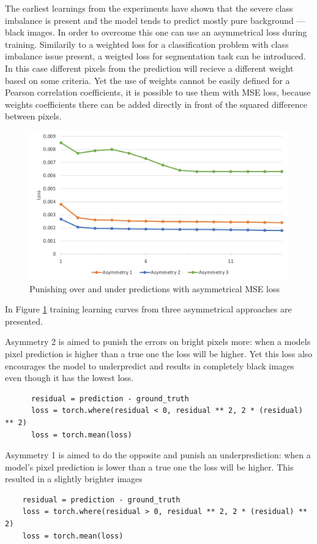 The earliest learnings from the experiments have shown that the severe class imbalance is present and the model tends to predict mostly pure background --- black images. In order to overcome this one can use an asymmetrical loss during training. Similarily to a weighted loss for a classification problem with class imbalance issue present, a weigted loss for segmentation task can be introduced. In this case different pixels from the prediction will recieve a different weight based on some criteria. Yet the use of weights cannot be easily defined for a Pearson correlation coefficients, it is possible to use them with MSE loss, because weights coefficients there can be added directly in front of the squared difference between pixels. 
\begin{figure}[H]
	\begin{center}
		\includegraphics[width=0.5\linewidth]{bilder/golgi/asymmetrical-training.jpg}
		\caption{Punishing over and under predictions with asymmetrical MSE loss}\label{fig:golgi-asymmetrical-training}
	\end{center}
\end{figure}

In Figure \ref{fig:golgi-asymmetrical-training} training learning curves from three asymmetrical approaches are presented.

Asymmetry 2 is aimed to punish the errors on bright pixels more: when a models pixel prediction is higher than a true one the loss will be higher. Yet this loss also encourages the model to underpredict and results in completely black images even though it has the lowest loss.
  \begin{lstlisting}
	  residual = prediction - ground_truth
	  loss = torch.where(residual < 0, residual ** 2, 2 * (residual) ** 2)
	  loss = torch.mean(loss)
	\end{lstlisting}

Asymmetry 1 is aimed to do the opposite and punish an underprediction: when a model's pixel prediction is lower than a true one the loss will be higher. This resulted in a slightly brighter images
\begin{lstlisting}
	residual = prediction - ground_truth
	loss = torch.where(residual > 0, residual ** 2, 2 * (residual) ** 2)
	loss = torch.mean(loss)
  \end{lstlisting}

